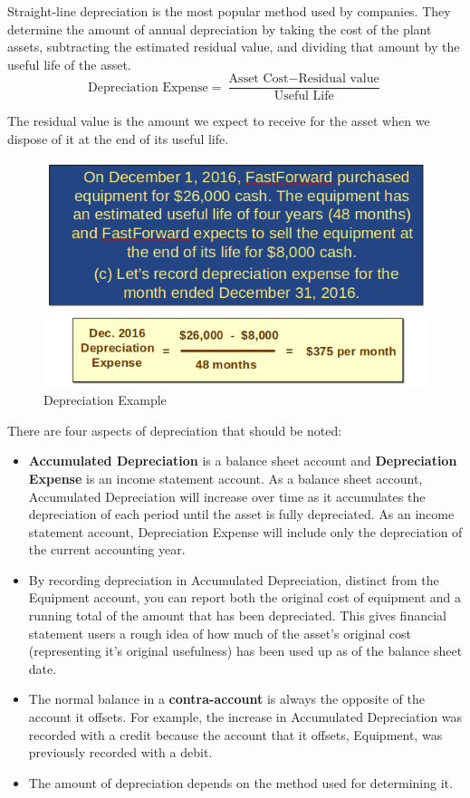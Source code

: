 \documentclass[../main.tex]{subfiles}
\begin{document}
	Straight-line depreciation is the most popular method used by companies. 
	They determine the amount of annual depreciation by taking the cost of the 
	plant assets, subtracting the estimated residual value, and dividing that 
	amount by the useful life of the asset. 
	\[
	\text{Depreciation Expense} = \frac{\text{Asset Cost} - \text{Residual 
	value}}{\text{Useful Life}}
	\]
	
	The residual value is the amount we 
	expect to receive for the asset when we dispose of it at the end of its 
	useful life.
	
	\begin{figure}[ht!]
		\centering
		\includegraphics[width=0.8\columnwidth]{images/c3/depreciation_eg.png}
		\caption{Depreciation Example}	
	\end{figure}
	
	There are four aspects of depreciation that should be noted: 
	
	\begin{itemize}[noitemsep]
		\item \textbf{Accumulated Depreciation} is a balance sheet account and 
		\textbf{Depreciation Expense} is an income statement account. As a 
		balance sheet 
		account, Accumulated Depreciation will increase over time as it 
		accumulates the depreciation of each period until the asset is fully 
		depreciated. As an income statement account, Depreciation Expense will 
		include only the depreciation of the current accounting year.
		\item By recording depreciation in Accumulated Depreciation, distinct 
		from the Equipment account, you can report both the original cost of 
		equipment and a running total of the amount that has been depreciated. 
		This gives financial statement users a rough idea of how much of the 
		asset’s original cost (representing it’s original usefulness) has been 
		used up as of the balance sheet date.
		\item The normal balance in a \textbf{contra-account} is always the 
		opposite 
		of the account it offsets. For example, the increase in Accumulated 
		Depreciation was recorded with a credit because the account that it 
		offsets, Equipment, was previously recorded with a debit.
		\item The amount of depreciation depends on the method used for 
		determining it.	
	\end{itemize}
	
\end{document}
